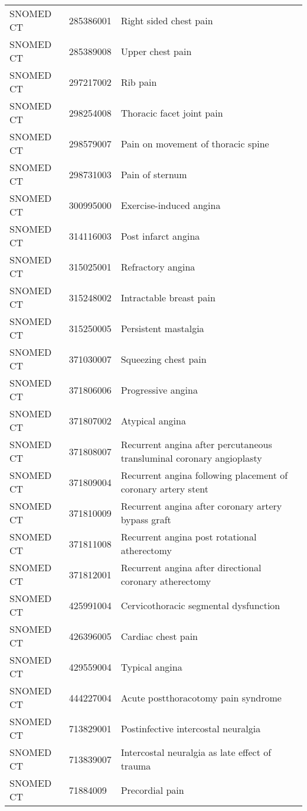 \begin{longtable}{p{}p{}p{}}
  SNOMED CT & 285386001 & Right sided chest pain \\ 
  SNOMED CT & 285389008 & Upper chest pain \\ 
  SNOMED CT & 297217002 & Rib pain \\ 
  SNOMED CT & 298254008 & Thoracic facet joint pain \\ 
  SNOMED CT & 298579007 & Pain on movement of thoracic spine \\ 
  SNOMED CT & 298731003 & Pain of sternum \\ 
  SNOMED CT & 300995000 & Exercise-induced angina \\ 
  SNOMED CT & 314116003 & Post infarct angina \\ 
  SNOMED CT & 315025001 & Refractory angina \\ 
  SNOMED CT & 315248002 & Intractable breast pain \\ 
  SNOMED CT & 315250005 & Persistent mastalgia \\ 
  SNOMED CT & 371030007 & Squeezing chest pain \\ 
  SNOMED CT & 371806006 & Progressive angina \\ 
  SNOMED CT & 371807002 & Atypical angina \\ 
  SNOMED CT & 371808007 & Recurrent angina after percutaneous transluminal coronary angioplasty \\ 
  SNOMED CT & 371809004 & Recurrent angina following placement of coronary artery stent \\ 
  SNOMED CT & 371810009 & Recurrent angina after coronary artery bypass graft \\ 
  SNOMED CT & 371811008 & Recurrent angina post rotational atherectomy \\ 
  SNOMED CT & 371812001 & Recurrent angina after directional coronary atherectomy \\ 
  SNOMED CT & 425991004 & Cervicothoracic segmental dysfunction \\ 
  SNOMED CT & 426396005 & Cardiac chest pain \\ 
  SNOMED CT & 429559004 & Typical angina \\ 
  SNOMED CT & 444227004 & Acute postthoracotomy pain syndrome \\ 
  SNOMED CT & 713829001 & Postinfective intercostal neuralgia \\ 
  SNOMED CT & 713839007 & Intercostal neuralgia as late effect of trauma \\ 
  SNOMED CT & 71884009 & Precordial pain \\ 

\end{longtable}
